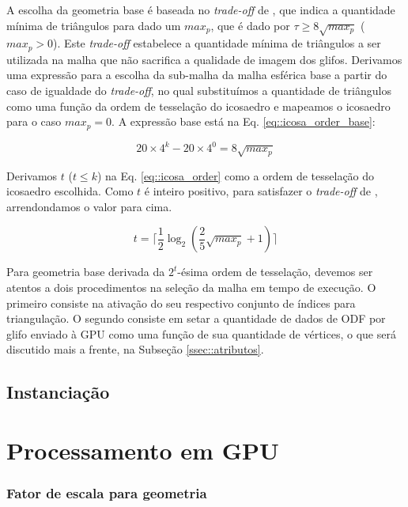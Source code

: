 A escolha da geometria base é baseada no \textit{trade-off} de , que indica a quantidade mínima de triângulos para dado um $max_p$, que é dado por $\tau \geq 8\sqrt{max_p}$  ($max_p > 0$). Este \textit{trade-off} estabelece a quantidade mínima de triângulos a ser utilizada na malha que não sacrifica a qualidade de imagem dos glifos. Derivamos uma expressão para a escolha da sub-malha da malha esférica base a partir do caso de igualdade do \textit{trade-off}, no qual substituímos a quantidade de triângulos como uma função da ordem de tesselação do icosaedro e mapeamos o icosaedro para o caso $max_p = 0$. A expressão base está na Eq. \ref{eq::icosa_order_base}:

\begin{equation}
\label{eq::icosa_order_base}
     20\times 4^k - 20\times 4^0 = 8\sqrt{max_p}
\end{equation}

Derivamos $t$ ($t \leq k$) na Eq. \ref{eq::icosa_order} como a ordem de tesselação do icosaedro escolhida. Como $t$ é inteiro positivo, para satisfazer o \textit{trade-off} de , arrendondamos o valor para cima.

\begin{equation}
\label{eq::icosa_order}
     t = \lceil \frac{1}{2}\log_2{(\frac{2}{5}\sqrt{max_p} + 1)} \rceil
\end{equation}

Para geometria base derivada da $2^t$-ésima ordem de tesselação, devemos ser atentos a dois procedimentos na seleção da malha em tempo de execução. O primeiro consiste na ativação do seu respectivo conjunto de índices para triangulação. O segundo consiste em setar a quantidade de dados de ODF por glifo enviado à GPU como uma função de sua quantidade de vértices, o que será discutido mais a frente, na Subseção \ref{ssec::atributos}.

\subsection{Instanciação}

\section{Processamento em GPU}

\subsubsection{Fator de escala para geometria}

